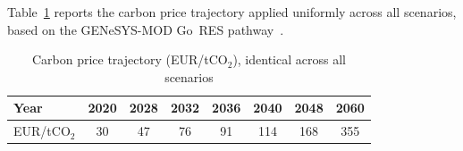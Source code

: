 \documentclass[conference]{IEEEtran}
\begin{document}
Table~\ref{tab:carbon_price} reports the carbon price trajectory applied uniformly across all scenarios, based on the GENeSYS-MOD Go~RES pathway~\cite{b_genesys}.

\begin{table}[htbp]
\caption{Carbon price trajectory (EUR/tCO$_2$), identical across all scenarios}
\label{tab:carbon_price}
\begin{center}
\footnotesize
\begin{tabular}{@{}l c c c c c c c@{}}
\toprule
\textbf{Year} & 2020 & 2028 & 2032 & 2036 & 2040 & 2048 & 2060 \\
\midrule
EUR/tCO$_2$ & 30 & 47 & 76 & 91 & 114 & 168 & 355 \\
\bottomrule
\end{tabular}
\end{center}
\end{table}
\end{document}
